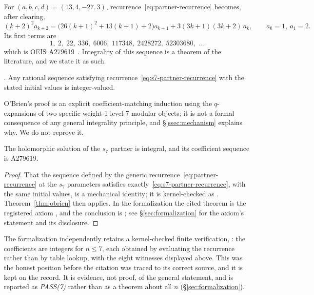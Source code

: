 For $(a,b,c,d) = (13,4,-27,3)$, recurrence~\eqref{eq:partner-recurrence}
becomes, after clearing,
\begin{equation}\label{eq:s7-partner-recurrence}
  (k+2)^2a_{k+2}
  = \bigl(26(k+1)^2 + 13(k+1) + 2\bigr)a_{k+1}
    + 3(3k+1)(3k+2)\,a_k,
  \qquad a_0=1,\ a_1=2 .
\end{equation}
Its first terms are
\[
  1,\;2,\;22,\;336,\;6006,\;117348,\;2428272,\;52303680,\;\dots
\]
which is OEIS A279619~\cite{OEIS}. Integrality of this sequence is a theorem
of the literature, and we state it as such.

\begin{theorem}\label{thm:obrien}
\cite[Thm.~6.2, p.~47]{OBrien2016}. Any rational sequence satisfying
recurrence~\eqref{eq:s7-partner-recurrence} with the stated initial values is
integer-valued.
\end{theorem}

O'Brien's proof is an explicit coefficient-matching induction using the
$q$-expansions of two specific weight-1 level-7 modular objects; it is not a
formal consequence of any general integrality principle, and \S\ref{ssec:mechanism}
explains why. We do not reprove it.

\begin{corollary}
\label{cor:s7-integral}
The holomorphic solution of the $s_7$ partner is integral, and its coefficient
sequence is A279619.
\end{corollary}

\begin{proof}
That the sequence defined by the generic
recurrence~\eqref{eq:partner-recurrence} at the $s_7$ parameters satisfies
exactly~\eqref{eq:s7-partner-recurrence}, with the same initial values, is a
mechanical identity; it is kernel-checked as
. Theorem~\ref{thm:obrien} then applies.
In the formalization the cited theorem is the registered axiom
, and the conclusion is
; see \S\ref{sec:formalization} for the axiom's
statement and its disclosure.
\end{proof}

\begin{remark}[PASS(7)]\label{rem:pass7}
The formalization independently retains a kernel-checked finite verification,
: the coefficients are integers for
$n\leq7$, each obtained by evaluating the recurrence rather than by table
lookup, with the eight witnesses displayed above. This was the honest position
before the citation was traced to its correct source, and it is kept on the
record. It is evidence, not proof, of the general statement, and is reported
as \emph{PASS(7)} rather than as a theorem about all $n$
(\S\ref{sec:formalization}).
\end{remark}

